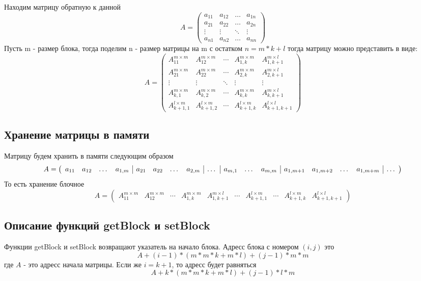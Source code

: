 \documentclass[a4paper,12pt]{article}
\begin{document}
Находим матрицу обратную к данной
$$A=
   \begin{pmatrix}
     a_{11}& a_{12} &\ldots & a_{1n}\\
     a_{21}& a_{22} &\ldots & a_{2n}\\
     \vdots& \vdots &\ddots & \vdots\\
     a_{n1}& a_{n2} &\ldots & a_{nn}
    \end{pmatrix}
$$
Пусть m - размер блока, тогда поделим n - размер матрицы на m с остатком $n = m*k + l$ тогда матрицу
можно представить в виде:
$$A=
  \begin{pmatrix} 
    A_{11}^{m \times m} & A_{12}^{m \times m} & \cdots & A_{1,k}^{m \times m} & A_{1,k+1}^{m \times l} \\
    A_{21}^{m \times m} & A_{22}^{m \times m} & \cdots & A_{2,k}^{m \times m} & A_{2,k+1}^{m \times l} \\ 
    \vdots & \vdots & \ddots & \vdots & \vdots \\ 
    A_{k,1}^{m \times m} & A_{k,2}^{m \times m} & \cdots & A_{k,k}^{m \times m} & A_{k,k+1}^{m \times l} \\
    A_{k+1,1}^{l \times m} & A_{k+1,2}^{l \times m} & \cdots & A_{k+1,k}^{l \times m} & A_{k+1,k+1}^{l \times l} 
  \end{pmatrix}
$$

\subsection{Хранение матрицы в памяти}
Матрицу будем хранить в памяти следующим образом
$$
A = \left(
\begin{array}{c c c c | c c c c | c | c c c | c c c c | c}
    a_{11} & a_{12} & \dots & a_{1,m} & a_{21} & a_{22} & \dots & a_{2,m} & \dots & a_{m,1} &
    \dots & a_{m,m} & a_{1,m+1} & a_{1,m+2} & \dots & a_{1,m+m} & \dots
\end{array}
\right)
$$
То есть хранение блочное
$$A=
  \begin{pmatrix} 
      A_{11}^{m \times m} & A_{12}^{m \times m} & \cdots & A_{1,k}^{m \times m} &
      A_{1,k+1}^{m \times l} & \cdots & A_{k+1,1}^{l \times m} & \cdots & 
      A_{k+1,k}^{l \times m} & A_{k+1,k+1}^{l \times l} 
  \end{pmatrix}
$$

\subsection{Описание функций getBlock и setBlock}
Функции getBlock и setBlock возвращают указатель на начало блока. Адресс блока с номером
$(i, j)$ это $$A + (i - 1) * (m * m * k + m * l) + (j - 1) * m * m$$ где $A$ - это адресс 
начала матрицы.
Если же $i = k + 1$, то адресс будет равняться 
$$A + k * (m * m * k + m * l) + (j - 1) * l * m$$
\end{document}
